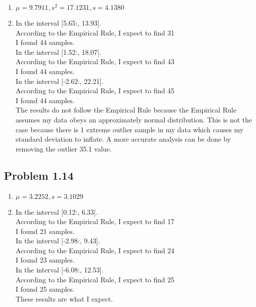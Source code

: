 \documentclass[12pt]{article}
\begin{document}
    \begin{enumerate}[label=(\alph*).]
        \item $\mu = 9.7911, s^2 = 17.1231, s = 4.1380$
        
        \item In the interval [5.65:, 13.93]. \\
        According to the Empirical Rule, I expect to find 31 \\
        I found 44 samples. \\
        
        
        In the interval [1.52:, 18.07]. \\
        According to the Empirical Rule, I expect to find 43\\
        I found 44 samples.\\
        
        
        In the interval [-2.62:, 22.21].\\
        According to the Empirical Rule, I expect to find 45\\
        I found 44 samples.\\
        
        The results do not follow the Empirical Rule because the Empirical Rule assumes my data obeys an approximately normal distribution.
        This is not the case because there is 1 extreme outlier sample in my data which causes my standard deviation to inflate.
        A more accurate analysis can be done by removing the outlier 35.1 value.
        
    \end{enumerate}

\subsection*{Problem 1.14}
    \begin{enumerate}[label=(\alph*).]
        \item $\mu = 3.2252, s = 3.1029$
        
        \item In the interval [0.12:, 6.33].\\
        According to the Empirical Rule, I expect to find 17\\
        I found 21 samples.\\
        
        
        In the interval [-2.98:, 9.43].\\
        According to the Empirical Rule, I expect to find 24\\
        I found 23 samples.\\
        
        
        In the interval [-6.08:, 12.53].\\
        According to the Empirical Rule, I expect to find 25\\
        I found 25 samples.\\
        
        These results are what I expect.\\
        
    \end{enumerate}
    
\end{document}
